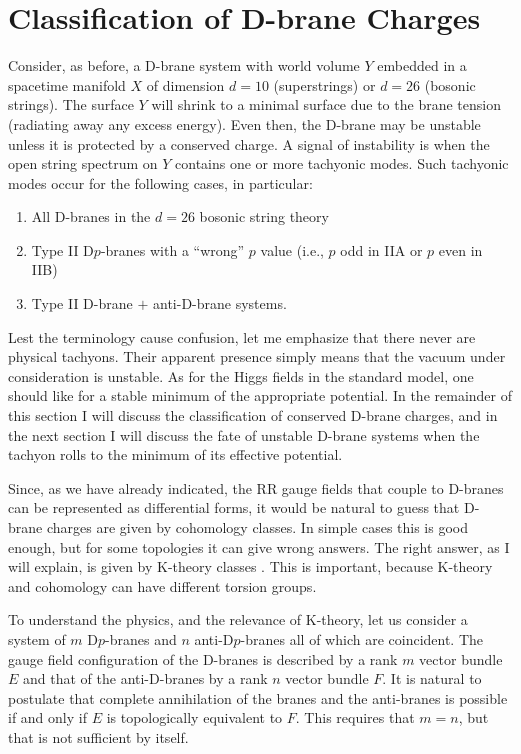 \documentclass[a4paper,12pt]{article}
\begin{document}
\section{Classification of D-brane Charges}

Consider, as before, a D-brane system with world volume $Y$
embedded in a spacetime manifold $X$ of dimension $d = 10$
(superstrings) or $d = 26$ (bosonic strings).  The surface $Y$
will shrink to a minimal surface due to the brane tension
(radiating away any excess energy).  Even then, the D-brane may be
unstable unless it is protected by a conserved charge.  A signal
of instability is when the open string spectrum on $Y$ contains
one or more tachyonic modes. Such tachyonic modes occur for the
following cases, in particular:
\begin{enumerate}
\item All D-branes in the $d=26$ bosonic string theory
\item Type II D$p$-branes with a ``wrong'' $p$ value (i.e., $p$ odd in IIA or $p$
even in IIB)
\item Type II D-brane $+$ anti-D-brane systems.
\end{enumerate}
Lest the terminology cause confusion, let me emphasize that there
never are physical tachyons. Their apparent presence simply means
that the vacuum under consideration is unstable. As for the Higgs
fields in the standard model, one should like for a stable minimum
of the appropriate potential. In the remainder of this section I
will discuss the classification of conserved D-brane charges, and
in the next section I will discuss the fate of unstable D-brane
systems when the tachyon rolls to the minimum of its effective
potential.

Since, as we have already indicated, the RR gauge fields that
couple to D-branes can be represented as differential forms, it
would be natural to guess that D-brane charges are given by
cohomology classes.  In simple cases this is good enough, but for
some topologies it can give wrong answers.  The right answer, as I
will explain, is given by K-theory classes \cite{MM, W2}. This is important,
because K-theory and cohomology can have different torsion groups.

To understand the physics, and the relevance of K-theory, let us
consider a system of $m$ D$p$-branes and $n$ anti-D$p$-branes all
of which are coincident. The gauge field configuration of the
D-branes is described by a rank $m$ vector bundle $E$ and that of
the anti-D-branes by a rank $n$ vector bundle $F$. It is natural
to postulate that complete annihilation of the branes and the
anti-branes is possible if and only if $E$ is topologically
equivalent to $F$. This requires that $m = n$, but that is not
sufficient by itself.
\end{document}
